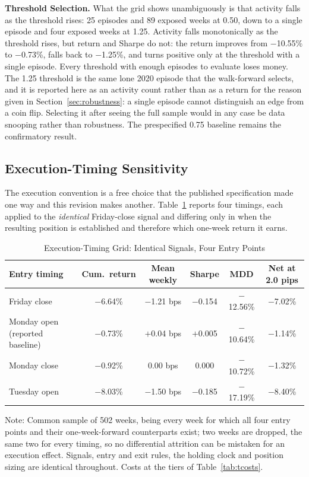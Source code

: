 \documentclass[11pt]{article}
\begin{document}
\textbf{Threshold Selection.} What the grid shows unambiguously is that activity falls as the threshold rises: 25 episodes and 89 exposed weeks at 0.50, down to a single episode and four exposed weeks at 1.25. Activity falls monotonically as the threshold rises, but return and Sharpe do not: the return improves from $-$10.55\% to $-$0.73\%, falls back to $-$1.25\%, and turns positive only at the threshold with a single episode. Every threshold with enough episodes to evaluate loses money. The 1.25 threshold is the same lone 2020 episode that the walk-forward selects, and it is reported here as an activity count rather than as a return for the reason given in Section~\ref{sec:robustness}: a single episode cannot distinguish an edge from a coin flip. Selecting it after seeing the full sample would in any case be data snooping rather than robustness. The prespecified 0.75 baseline remains the confirmatory result.

\subsection{Execution-Timing Sensitivity}
\label{sec:exectiming}

The execution convention is a free choice that the published specification made one way and this revision makes another. Table~\ref{tab:exectiming} reports four timings, each applied to the \emph{identical} Friday-close signal and differing only in when the resulting position is established and therefore which one-week return it earns.

\begin{table}[H]
\centering
\caption{Execution-Timing Grid: Identical Signals, Four Entry Points}
\label{tab:exectiming}
\small
\begin{tabular}{@{}lccccc@{}}
\toprule
Entry timing & Cum.\ return & Mean weekly & Sharpe & MDD & Net at 2.0 pips \\
\midrule
Friday close & $-$6.64\% & $-$1.21 bps & $-$0.154 & $-$12.56\% & $-$7.02\% \\
Monday open (reported baseline) & $-$0.73\% & $+$0.04 bps & $+$0.005 & $-$10.64\% & $-$1.14\% \\
Monday close & $-$0.92\% & 0.00 bps & 0.000 & $-$10.72\% & $-$1.32\% \\
Tuesday open & $-$8.03\% & $-$1.50 bps & $-$0.185 & $-$17.19\% & $-$8.40\% \\
\bottomrule
\end{tabular}
\par\vspace{0.3em}
\parbox{\linewidth}{\footnotesize Note: Common sample of 502 weeks, being every week for which all four entry points and their one-week-forward counterparts exist; two weeks are dropped, the same two for every timing, so no differential attrition can be mistaken for an execution effect. Signals, entry and exit rules, the holding clock and position sizing are identical throughout. Costs at the tiers of Table~\ref{tab:tcosts}.}
\end{table}
\end{document}
